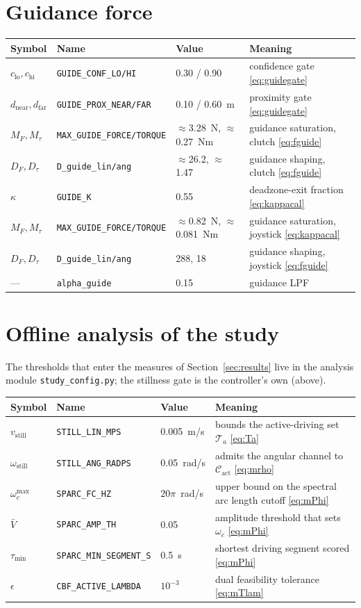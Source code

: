 \documentclass[12pt,a4paper,twoside,openright]{report}
\begin{document}
\section{Guidance force}
\begin{tabularx}{\linewidth}{@{}lllX@{}}
\toprule
Symbol & Name & Value & Meaning \\
\midrule
$c_{\text{lo}}, c_{\text{hi}}$ & \texttt{GUIDE\_CONF\_LO/HI} & 0.30 / 0.90 & confidence gate \eqref{eq:guidegate} \\
$d_{\text{near}}, d_{\text{far}}$ & \texttt{GUIDE\_PROX\_NEAR/FAR} & 0.10 / 0.60~m & proximity gate \eqref{eq:guidegate} \\
$M_F, M_\tau$ & \texttt{MAX\_GUIDE\_FORCE/TORQUE} & $\approx$3.28~N, $\approx$0.27~Nm & guidance saturation, clutch \eqref{eq:fguide} \\
$D_F, D_\tau$ & \texttt{D\_guide\_lin/ang} & $\approx$26.2, $\approx$1.47 & guidance shaping, clutch \eqref{eq:fguide} \\
$\kappa$ & \texttt{GUIDE\_K} & 0.55 & deadzone-exit fraction \eqref{eq:kappacal} \\
$M_F, M_\tau$ & \texttt{MAX\_GUIDE\_FORCE/TORQUE} & $\approx$0.82~N, $\approx$0.081~Nm & guidance saturation, joystick \eqref{eq:kappacal} \\
$D_F, D_\tau$ & \texttt{D\_guide\_lin/ang} & 288, 18 & guidance shaping, joystick \eqref{eq:fguide} \\
--- & \texttt{alpha\_guide} & 0.15 & guidance LPF \\
\bottomrule
\end{tabularx}

\section{Offline analysis of the study}
The thresholds that enter the measures of Section~\ref{sec:results} live in the analysis module \texttt{study\_config.py}; the stillness gate is the controller's own (above).

\noindent\begin{tabularx}{\linewidth}{@{}lllX@{}}
\toprule
Symbol & Name & Value & Meaning \\
\midrule
$v_{\text{still}}$ & \texttt{STILL\_LIN\_MPS} & 0.005~m/s & bounds the active-driving set $\mathcal{T}_a$ \eqref{eq:Ta} \\
$\omega_{\text{still}}$ & \texttt{STILL\_ANG\_RADPS} & 0.05~rad/s & admits the angular channel to $\mathcal{C}_{\mathrm{act}}$ \eqref{eq:mrho} \\
$\omega_c^{\max}$ & \texttt{SPARC\_FC\_HZ} & $20\pi$~rad/s & upper bound on the spectral arc length cutoff \eqref{eq:mPhi} \\
$\bar{V}$ & \texttt{SPARC\_AMP\_TH} & 0.05 & amplitude threshold that sets $\omega_c$ \eqref{eq:mPhi} \\
$\tau_{\min}$ & \texttt{SPARC\_MIN\_SEGMENT\_S} & 0.5~s & shortest driving segment scored \eqref{eq:mPhi} \\
$\epsilon$ & \texttt{CBF\_ACTIVE\_LAMBDA} & $10^{-3}$ & dual feasibility tolerance \eqref{eq:mTlam} \\
\bottomrule
\end{tabularx}
\end{document}
